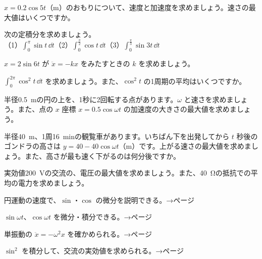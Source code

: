 \bkproblem $x=0.2\cos5t$（m）のおもりについて、速度と加速度を求めましょう。速さの最大値はいくつですか。

\bkproblem 次の定積分を求めましょう。\\
（1）$\displaystyle\int_0^{\pi}\sin t\,\dd t$\qquad（2）$\displaystyle\int_0^{\frac{\pi}{2}}\cos t\,\dd t$\qquad（3）$\displaystyle\int_0^{\frac{\pi}{3}}\sin3t\,\dd t$

\bkproblem $x=2\sin6t$ が $\ddot{x}=-kx$ をみたすときの $k$ を求めましょう。

\bkproblem $\displaystyle\int_0^{2\pi}\cos^2t\,\dd t$ を求めましょう。また、$\cos^2t$ の1周期の平均はいくつですか。


\bkproblem 半径\qty{0.5}{m}の円の上を、1秒に2回転する点があります。$\omega$ と速さを求めましょう。また、点の $x$ 座標 $x=0.5\cos\omega t$ の加速度の大きさの最大値を求めましょう。

\bkproblem 半径\qty{40}{m}、1周\qty{16}{min}の観覧車があります。いちばん下を出発してから $t$ 秒後のゴンドラの高さは $y=40-40\cos\omega t$（m）です。上がる速さの最大値を求めましょう。また、高さが最も速く下がるのは何分後ですか。

\bkproblem 実効値\qty{200}{V}の交流の、電圧の最大値を求めましょう。また、\qty{40}{\ohm}の抵抗での平均の電力を求めましょう。

\begin{furikaeri}
\begin{checklist}
\item 円運動の速度で、$\sin$・$\cos$ の微分を説明できる。\hfill{\footnotesize\sffamily\color{bkTheme}→\pageref{bk:5-15:en}ページ}
\item $\sin\omega t$、$\cos\omega t$ を微分・積分できる。\hfill{\footnotesize\sffamily\color{bkTheme}→\pageref{bk:5-15:omega}ページ}
\item 単振動の $\ddot{x}=-\omega^2x$ を確かめられる。\hfill{\footnotesize\sffamily\color{bkTheme}→\pageref{bk:5-15:nikai}ページ}
\item $\sin^2$ を積分して、交流の実効値を求められる。\hfill{\footnotesize\sffamily\color{bkTheme}→\pageref{bk:5-15:jikko}ページ}
\end{checklist}
\end{furikaeri}

